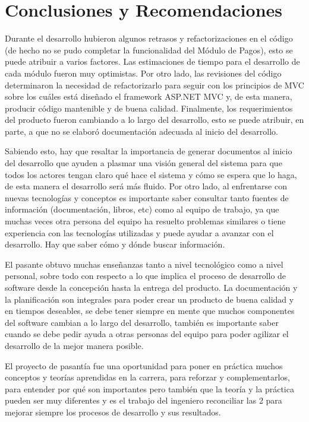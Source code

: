 \chapter*{Conclusiones y Recomendaciones}
Durante el desarrollo hubieron algunos retrasos y refactorizaciones en el código (de hecho no se pudo completar la funcionalidad del Módulo de Pagos), esto se puede atribuir a varios factores. Las estimaciones de tiempo para el desarrollo de cada módulo fueron muy optimistas. Por otro lado, las revisiones del código determinaron la necesidad de refactorizarlo para seguir con los principios de MVC sobre los cuáles está diseñado el framework ASP.NET MVC y, de esta manera, producir código mantenible y de buena calidad. Finalmente, los requerimientos del producto fueron cambiando a lo largo del desarrollo, esto se puede atribuir, en parte, a que no se elaboró documentación adecuada al inicio del desarrollo.

Sabiendo esto, hay que resaltar la importancia de generar documentos al inicio del desarrollo que ayuden a plasmar una visión general del sistema para que todos los actores tengan claro qué hace el sistema y cómo se espera que lo haga, de esta manera el desarrollo será más fluido. Por otro lado, al enfrentarse con nuevas tecnologías y conceptos es importante saber consultar tanto fuentes de información (documentación, libros, etc) como al equipo de trabajo, ya que muchas veces otra persona del equipo ha resuelto problemas similares o tiene experiencia con las tecnologías utilizadas y puede ayudar a avanzar con el desarrollo. Hay que saber cómo y dónde buscar información.

El pasante obtuvo muchas enseñanzas tanto a nivel tecnológico como a nivel personal, sobre todo con respecto a lo que implica el proceso de desarrollo de software desde la concepción hasta la entrega del producto. La documentación y la planificación son integrales para poder crear un producto de buena calidad y en tiempos deseables, se debe tener siempre en mente que muchos componentes del software cambian a lo largo del desarrollo, también es importante saber cuando se debe pedir ayuda a otras personas del equipo para poder agilizar el desarrollo de la mejor manera posible.

El proyecto de pasantía fue una oportunidad para poner en práctica muchos conceptos y teorías aprendidas en la carrera, para reforzar y complementarlos, para entender por qué son importantes pero también que la teoría y la práctica pueden ser muy diferentes y es el trabajo del ingeniero reconciliar las 2 para mejorar siempre los procesos de desarrollo y sus resultados.

